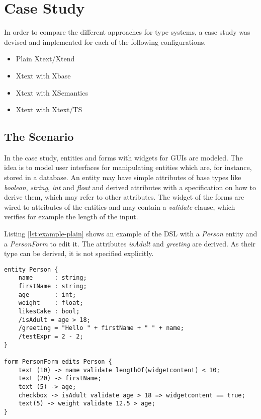 \section{Case Study}
\label{sec:casestudy}

In order to compare the different approaches for type systems, a case study was devised and implemented for each of the following configurations.

\begin{itemize}
\item Plain Xtext/Xtend
\item Xtext with Xbase
\item Xtext with XSemantics
\item Xtext with Xtext/TS
\end{itemize}

\subsection{The Scenario}
In the case study, entities and forms with widgets for GUIs are modeled. The idea is to model user interfaces for manipulating entities which are, for instance, stored in a database. An entity may have simple attributes of base types like \emph{boolean}, \emph{string}, \emph{int} and \emph{float} and derived attributes with a specification on how to derive them, which may refer to other attributes. The widget of the forms are wired to attributes of the entities and may contain a \emph{validate} clause, which verifies for example the length of the input.

Listing \ref{lst:example-plain} shows an example of the DSL with a \emph{Person} entity and a \emph{PersonForm} to edit it. The attributes \emph{isAdult} and \emph{greeting} are derived. As their type can be derived, it is not specified explicitly.

%

\begin{lstlisting}[language=guidsl,float,label=lst:example-plain,caption=Forms
and Entities DSL] 
entity Person {
	name      : string;
	firstName : string;
	age       : int; 
	weight    : float;
	likesCake : bool; 
	/isAdult = age > 18;
	/greeting = "Hello " + firstName + " " + name;
	/testExpr = 2 - 2;
}

form PersonForm edits Person {
	text (10) -> name validate lengthOf(widgetcontent) < 10;
	text (20) -> firstName;
	text (5) -> age;
	checkbox -> isAdult validate age > 18 => widgetcontent == true;
	text(5) -> weight validate 12.5 > age;
}
\end{lstlisting}


